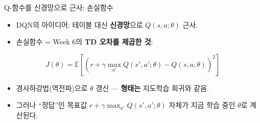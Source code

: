 \begin{frame}{Q-함수를 신경망으로 근사: 손실함수}
  \begin{itemize}
    \item DQN의 아이디어: 테이블 대신 \textbf{신경망}으로 $Q(s,a;\theta)$ 근사.
    \item 손실함수 = Week 6의 \textbf{TD 오차를 제곱한 것}:
  \end{itemize}
  \[
  J(\theta) = \mathbb{E}\left[\left(r + \gamma \max_{a'} Q(s',a';\theta)
  - Q(s,a;\theta)\right)^2\right]
  \]
  \begin{itemize}
    \item 경사하강법(역전파)으로 $\theta$ 갱신 --- \textbf{형태는}
      지도학습 회귀와 같음.
    \item 그러나 ``정답''인 목표값 $r + \gamma \max_{a'} Q(s',a';\theta)$ 자체가
      지금 학습 중인 $\theta$로 계산된다.
  \end{itemize}
\end{frame}
